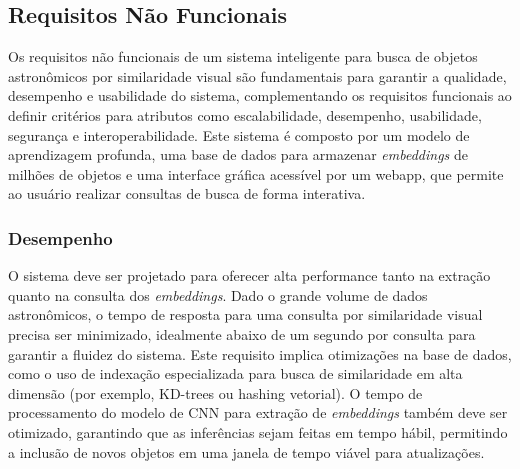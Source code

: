 \subsection{Requisitos Não Funcionais}
\label{sec:req-nao-funcionais}

Os requisitos não funcionais de um sistema inteligente para busca de objetos astronômicos por similaridade visual são fundamentais para garantir a qualidade, desempenho e usabilidade do sistema, complementando os requisitos funcionais ao definir critérios para atributos como escalabilidade, desempenho, usabilidade, segurança e interoperabilidade. Este sistema é composto por um modelo de aprendizagem profunda, uma base de dados para armazenar \emph{embeddings} de milhões de objetos e uma interface gráfica acessível por um webapp, que permite ao usuário realizar consultas de busca de forma interativa.





\subsubsection{Desempenho}
\label{sec:req-desempenho}

O sistema deve ser projetado para oferecer alta performance tanto na extração quanto na consulta dos \emph{embeddings}. Dado o grande volume de dados astronômicos, o tempo de resposta para uma consulta por similaridade visual precisa ser minimizado, idealmente abaixo de um segundo por consulta para garantir a fluidez do sistema. Este requisito implica otimizações na base de dados, como o uso de indexação especializada para busca de similaridade em alta dimensão (por exemplo, KD-trees ou hashing vetorial). O tempo de processamento do modelo de CNN para extração de \emph{embeddings} também deve ser otimizado, garantindo que as inferências sejam feitas em tempo hábil, permitindo a inclusão de novos objetos em uma janela de tempo viável para atualizações.







